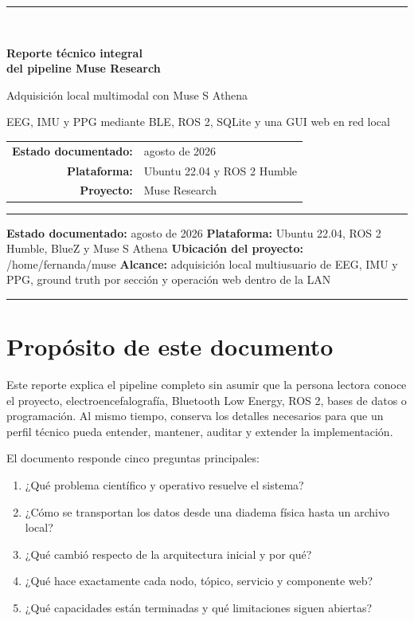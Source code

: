 \documentclass[11pt,a4paper]{article}
\begin{document}
\begin{titlepage}
  \centering
  \vspace*{2.5cm}
  {\color{MuseGreen}\rule{\textwidth}{1.2pt}}\\[1.2cm]
  {\Huge\bfseries Reporte técnico integral\\[0.25cm]
   del pipeline Muse Research\par}
  \vspace{1cm}
  {\Large Adquisición local multimodal con Muse S Athena\par}
  \vspace{1.4cm}
  {\large EEG, IMU y PPG mediante BLE, ROS 2, SQLite y una GUI web en red local\par}
  \vfill
  \begin{tabular}{rl}
    \textbf{Estado documentado:} & agosto de 2026 \\
    \textbf{Plataforma:} & Ubuntu 22.04 y ROS 2 Humble \\
    \textbf{Proyecto:} & Muse Research
  \end{tabular}
  \vfill
  {\color{MuseGreen}\rule{\textwidth}{1.2pt}}
\end{titlepage}

\tableofcontents
\clearpage
\textbf{Estado documentado:} agosto de 2026 \textbf{Plataforma:} Ubuntu 22.04, ROS 2 Humble, BlueZ y Muse S Athena \textbf{Ubicación del proyecto:} {\ttfamily\small /home/fernanda/muse} \textbf{Alcance:} adquisición local multiusuario de EEG, IMU y PPG, ground truth por sección y operación web dentro de la LAN

\medskip\hrule\medskip

\section{Propósito de este documento}

Este reporte explica el pipeline completo sin asumir que la persona lectora conoce el proyecto, electroencefalografía, Bluetooth Low Energy, ROS 2, bases de datos o programación. Al mismo tiempo, conserva los detalles necesarios para que un perfil técnico pueda entender, mantener, auditar y extender la implementación.

El documento responde cinco preguntas principales:

\begin{enumerate}
\item ¿Qué problema científico y operativo resuelve el sistema?
\item ¿Cómo se transportan los datos desde una diadema física hasta un archivo local?
\item ¿Qué cambió respecto de la arquitectura inicial y por qué?
\item ¿Qué hace exactamente cada nodo, tópico, servicio y componente web?
\item ¿Qué capacidades están terminadas y qué limitaciones siguen abiertas?
\end{enumerate}
\end{document}
